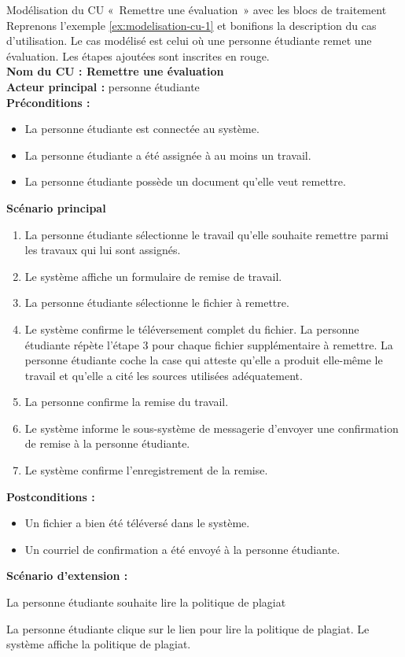 \begin{exemple}{Modélisation du CU «~Remettre une évaluation~» avec les blocs de traitement}
	Reprenons l'exemple \ref{ex:modelisation-cu-1} et bonifions la description du cas d'utilisation. Le cas modélisé est celui où une personne étudiante remet une évaluation. Les étapes ajoutées sont inscrites en rouge.  \\
	
	{\bfseries \Large Nom du CU : Remettre une évaluation}\\[6pt]
	{\bfseries Acteur principal : } personne étudiante\\[6pt]
	{\bfseries Préconditions : }
	\begin{itemize}
		\item La personne étudiante est connectée au système.
		\item La personne étudiante a été assignée à au moins un travail.
		\item La personne étudiante possède un document qu'elle veut remettre.
	\end{itemize} 
	{\bfseries Scénario principal}
	\begin{enumerate}
		\item La personne étudiante sélectionne le travail qu'elle souhaite remettre parmi les travaux qui lui sont assignés.
		\item Le système affiche un formulaire de remise de travail.
		\item La personne étudiante sélectionne le fichier à remettre.
		\item Le système confirme le téléversement complet du fichier.
		\reditem La personne étudiante répète l'étape 3 pour chaque fichier supplémentaire à remettre.
		\reditem La personne étudiante coche la case qui atteste qu'elle a produit elle-même le travail et qu'elle a cité les sources utilisées adéquatement.
		\item La personne confirme la remise du travail.
		\item Le système informe le sous-système de messagerie d'envoyer une confirmation de remise à la personne étudiante.
		\item Le système confirme l'enregistrement de la remise.
	\end{enumerate}
	{\bfseries Postconditions : }
	\begin{itemize}
		\item Un fichier a bien été téléversé dans le système.
		\item Un courriel de confirmation a été envoyé à la personne étudiante.
	\end{itemize} 
	{\color{red} \bfseries Scénario d'extension : }
	\begin{itemize}
		\reditem[6a] La personne étudiante souhaite lire la politique de plagiat 
		\begin{enumerate}
			\reditem La personne étudiante clique sur le lien pour lire la politique de plagiat.
			\reditem Le système affiche la politique de plagiat. 
		\end{enumerate}
	\end{itemize}
	

\end{exemple}
